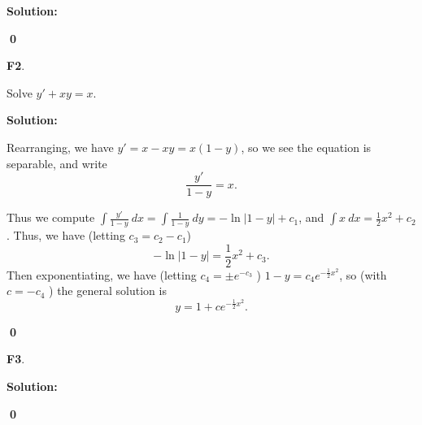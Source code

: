 \documentclass{article}
\newenvironment{problem}[1]
{
  \begin{flushleft}
  \textbf{#1}.
  \ignorespaces
}
{
  \end{flushleft}
}
\newenvironment{solution}
{
  \ignorespaces
  \textbf{Solution:}
}
{
  \ignorespacesafterend
  \begin{flushright}
  {\bfseries \qed}
  \end{flushright}
}
\begin{document}
\begin{solution}

\begin{center}\end{center}
\end{solution}


\begin{problem}{F2}
Solve \(y'+xy=x\).
\end{problem}
\begin{solution}
Rearranging, we have \(y'=x-xy=x(1-y)\), so we see the equation is separable, and write
\[ \frac{y'}{1-y} = x .\]

Thus we compute \(\int \frac{y'}{1-y}\ dx = \int \frac{1}{1-y}\ dy = -\ln|1-y|+c_1\), and \(\int x\ dx = \frac{1}{2}x^2+c_2\).  
Thus, we have (letting \(c_3=c_2-c_1\)) \[-\ln|1-y|=\frac{1}{2}x^2+c_3.\]
Then exponentiating, we have (letting \(c_4=\pm e^{-c_3}\) ) \(1-y=c_4e^{-\frac{1}{2}x^2}\), so (with \(c=-c_4\) ) the general solution is   \[y=1+c e^{-\frac{1}{2}x^2}.\]
\end{solution}

\begin{problem}{F3}

\end{problem}
\begin{solution}

\end{solution}
\end{document}
